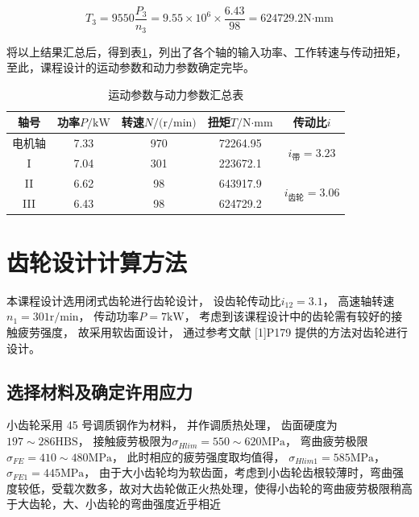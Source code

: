 \documentclass[12pt]{ctexart}
\begin{document}
$$T_3 = 9550\frac{P_3}{n_3} = 9.55\times 10^6\times \frac{6.43}{98}=624729.2\text{N·mm}$$

将以上结果汇总后，得到表\ref{table1}，列出了各个轴的输入功率、工作转速与传动扭矩，至此，课程设计的运动参数和动力参数确定完毕。

\begin{table}[h]
    \centering
    \setlength{\belowcaptionskip}{0.3cm}
    \caption{运动参数与动力参数汇总表}\label{table1}
    \begin{tabular}{c c c c c}
        \toprule
        轴号 & 功率$P/\text{kW}$ & 转速$N/\text{(r/min)}$ & 扭矩$T/\text{N·mm}$ & 传动比$i$ \\
        \midrule
        电机轴 & 7.33 & 970 & 72264.95 & \multirow{ 2}{*}{$i_{\text{带}}=3.23$}\\
        I & 7.04 & 301 & 223672.1 & \\
        II & 6.62 & 98 & 643917.9 & \multirow{ 2}{*}{$i_{\text{齿轮}}=3.06$}\\
        III & 6.43 & 98 & 624729.2 & \\
        \bottomrule
    \end{tabular}
    
\end{table}
    


\section{齿轮设计计算方法}

本课程设计选用闭式齿轮进行齿轮设计，
设齿轮传动比$i_{12}=3.1$，
高速轴转速$n_1=301 \text{r/min}$，
传动功率$P=7\text{kW}$，
考虑到该课程设计中的齿轮需有较好的接触疲劳强度，
故采用软齿面设计，
通过参考文献 [1]P179 提供的方法对齿轮进行设计。

\subsection{选择材料及确定许用应力}

小齿轮采用 45 号调质钢作为材料，
并作调质热处理，
齿面硬度为 $197\sim 286\text{HBS}$，
接触疲劳极限为$\sigma_{Hlim}=550\sim 620\text{MPa}$，
弯曲疲劳极限$\sigma_{FE}=410\sim 480\text{MPa}$，
此时相应的疲劳强度取均值得，
$\sigma_{Hlim1} = 585\text{MPa}$，
$\sigma_{FE1}=445\text{MPa}$，
由于大小齿轮均为软齿面，考虑到小齿轮齿根较薄时，弯曲强度较低，受载次数多，故对大齿轮做正火热处理，使得小齿轮的弯曲疲劳极限稍高于大齿轮，大、小齿轮的弯曲强度近乎相近
\end{document}
